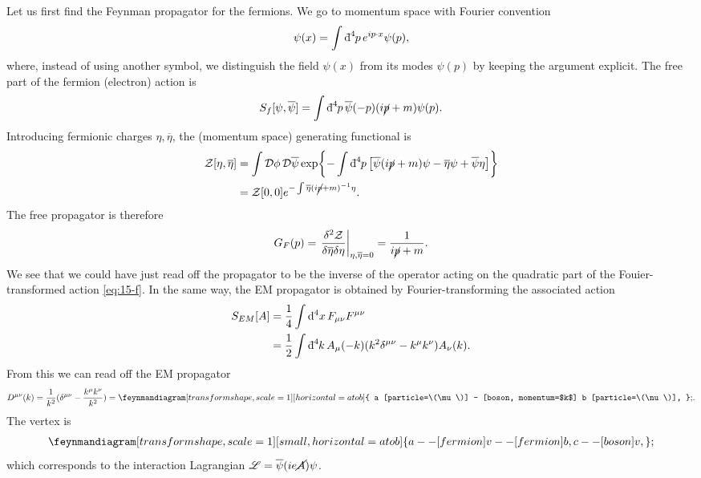Let us first find the Feynman propagator for the fermions.  We go to momentum space with Fourier convention
\begin{equation}
  \psi(x) = \int \bdd[4]{p} e^{i p \cdot x} \psi(p),
\end{equation}
where, instead of using another symbol, we distinguish the field $\psi(x)$ from its modes $\psi(p)$ by keeping the argument explicit.
The free part of the fermion (electron) action is
\begin{equation}
  \label{eq:15-f}
  S_f[\psi, \overline{\psi}{}] = \int \bdd[4]{p} \overline{\psi} (-p) (i \cancel{p} + m) \psi(p).
\end{equation}
Introducing fermionic charges $\eta, \overline{\eta}{}$, the (momentum space) generating functional is
\begin{align}
  \mathcal{Z} [\eta, \overline{\eta}{}] &= \int \pdd{\phi} \pdd{\overline{\psi}{}} \exp{ - \int \bdd[4]{p} \left[ \overline{\psi}{}(i \cancel{p} + m) \psi - \overline{\eta}{} \psi + \overline{\psi}{} \eta \right] } \\
					&= \mathcal{Z}[0, 0] e^{-\int \overline{\eta}{}(i \cancel{p} + m)^{-1} \eta}.
\end{align}
The free propagator is therefore 
\begin{equation}
  G_F(p) = \left.\frac{\delta^2 \mathcal{Z}}{\delta \overline{\eta}{} \delta \eta}\right\rvert_{\eta, \overline{\eta}{} = 0} = \frac{1}{i \cancel{p} + m}.
\end{equation}
We see that we could have just read off the propagator to be the inverse of the operator acting on the quadratic part of the Fouier-transformed action \eqref{eq:15-f}.
In the same way, the EM propagator is obtained by Fourier-transforming the associated action
\begin{align}
  S_{EM} [A] &= \frac{1}{4} \int \dd[4]{x} F_{\mu\nu} F^{\mu\nu} \\
	  &= \frac{1}{2} \int \bdd[4]{k} A_{\mu}(-k) (k^2 \delta^{\mu\nu} - k^{\mu} k^{\nu}) A_{\nu}(k).
\end{align}
From this we can read off the EM propagator
\begin{equation}
  D^{\mu\nu}(k) = \frac{1}{k^2} (\delta^{\mu\nu} - \frac{k^{\mu} k^{\nu}}{k^2}) = 
  \begin{gathered}
    \feynmandiagram[transform shape, scale=1][horizontal=a to b] {
      a [particle=\(\mu\)] -- [boson, momentum=$k$] b [particle=\(\nu\)],
    };
  \end{gathered}.
\end{equation}
The vertex is
\begin{equation}
  \begin{gathered}
    \feynmandiagram[transform shape, scale=1][small, horizontal=a to b] {
      a -- [fermion] v -- [fermion] b,
      c -- [boson] v, 
    };
  \end{gathered}
\end{equation}
which corresponds to the interaction Lagrangian $\mathscr{L} = \overline{\psi}{} (ie \cancel{A}) \psi$.
